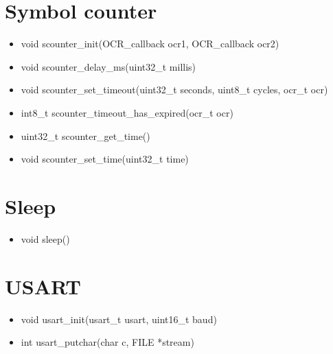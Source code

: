 \section{Symbol counter}
\begin{itemize}
	\item void scounter\_init(OCR\_callback ocr1, OCR\_callback ocr2)
	\item void scounter\_delay\_ms(uint32\_t millis)
	\item void scounter\_set\_timeout(uint32\_t seconds, uint8\_t cycles,
		ocr\_t ocr)
	\item int8\_t scounter\_timeout\_has\_expired(ocr\_t ocr)
	\item uint32\_t scounter\_get\_time()
	\item void scounter\_set\_time(uint32\_t time)
\end{itemize}

\section{Sleep}
\begin{itemize}
	\item void sleep()
\end{itemize}

\section{USART}
\begin{itemize}
	\item void usart\_init(usart\_t usart, uint16\_t baud)
	\item int usart\_putchar(char c, FILE *stream)
\end{itemize}

